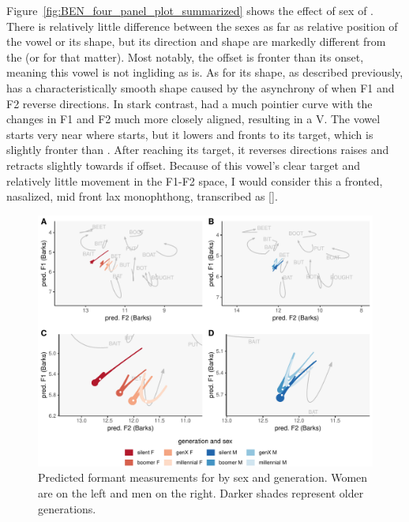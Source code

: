 Figure~\ref{fig:BEN_four_panel_plot_summarized} shows the effect of sex of \ben. There is relatively little difference between the sexes as far as relative position of the vowel or its shape, but its direction and shape are markedly different from the \ban (or \bin for that matter). Most notably, the offset is fronter than its onset, meaning this vowel is not ingliding as \bet is. As for its shape, as described previously, \ban has a characteristically smooth shape caused by the asynchrony of when F1 and F2 reverse directions. In stark contrast, \ben had a much pointier curve with the changes in F1 and F2 much more closely aligned, resulting in a V. The vowel starts very near where \bet starts, but it lowers and fronts to its target, which is slightly fronter than \bet. After reaching its target, it reverses directions raises and retracts slightly towards if offset. Because of this vowel's clear target and relatively little movement in the F1-F2 space, I would consider this a fronted, nasalized, mid front lax monophthong, transcribed as [].

\begin{figure}[tb!]
	\centering
	\includegraphics[width = 6.5in]{Figures/BEN/BEN_four_panel_plot.pdf}
	\caption[Predicted formant measurements for \ben by sex and generation.]{Predicted formant measurements for \ben by sex and generation. Women are on the left and men on the right. Darker shades represent older generations.}
	\label{fig:BEN_four_panel}
\end{figure}

